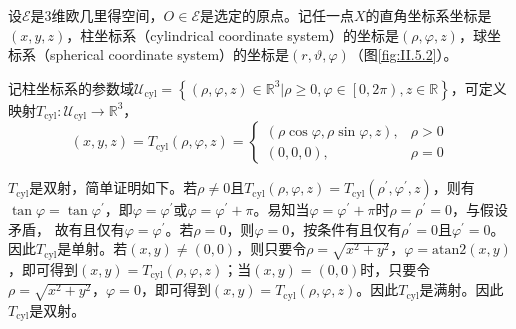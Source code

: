 \documentclass[../main.tex]{subfiles}
\begin{document}
\begin{example}[柱坐标系与球坐标系的参数域映射]\label{exp:II.5.1}
    设$\mathcal{E}$是3维欧几里得空间，$O\in\mathcal{E}$是选定的原点。记任一点$X$的直角坐标系坐标是$\left(x,y,z\right)$，柱坐标系（cylindrical coordinate system）的坐标是$\left(\rho,\varphi,z\right)$，球坐标系（spherical coordinate system）的坐标是$\left(r,\vartheta,\varphi\right)$（图\ref{fig:II.5.2}）。

    记柱坐标系的参数域$\mathcal{U}_\mathrm{cyl}=\left\{\left(\rho,\varphi,z\right)\in\mathbb{R}^3|\rho\geq 0,\varphi\in\left[0,2\pi\right),z\in\mathbb{R}\right\}$，可定义映射$T_\mathrm{cyl}:\mathcal{U}_\mathrm{cyl}\rightarrow\mathbb{R}^3$，
    \[\left(x,y,z\right)=T_\mathrm{cyl}\left(\rho,\varphi,z\right)=\left\{\begin{array}{ll}
            \left(\rho\cos\varphi,\rho\sin\varphi,z\right), & \rho>0 \\\left(0,0,0\right),&\rho=0\end{array}\right.\]

    $T_\mathrm{cyl}$是双射，简单证明如下。若$\rho\neq 0$且$T_\mathrm{cyl}\left(\rho,\varphi,z\right)=T_\mathrm{cyl}\left(\rho^\prime,\varphi^\prime,z\right)$，则有$\tan\varphi=\tan\varphi^\prime$，即$\varphi=\varphi^\prime$或$\varphi=\varphi^\prime+\pi$。易知当$\varphi=\varphi^\prime+\pi$时$\rho=\rho^\prime=0$，与假设矛盾， 故有且仅有$\varphi=\varphi^\prime$。若$\rho=0$，则$\varphi=0$，按条件有且仅有$\rho^\prime=0$且$\varphi^\prime=0$。因此$T_\mathrm{cyl}$是单射。若$\left(x,y\right)\neq\left(0,0\right)$，则只要令$\rho=\sqrt{x^2+y^2}$，$\varphi=\mathrm{atan2}\left(x,y\right)$，即可得到$\left(x,y\right)=T_\mathrm{cyl}\left(\rho,\varphi,z\right)$；当$\left(x,y\right)=\left(0,0\right)$时，只要令$\rho=\sqrt{x^2+y^2}$，$\varphi=0$，即可得到$\left(x,y\right)=T_\mathrm{cyl}\left(\rho,\varphi,z\right)$。因此$T_\mathrm{cyl}$是满射。因此$T_\mathrm{cyl}$是双射。


\end{example}
\end{document}
